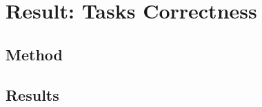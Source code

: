 
\section{Result: Tasks Correctness}
\label{cp6:correctness}





\subsection{Method}



\subsection{Results}
 




